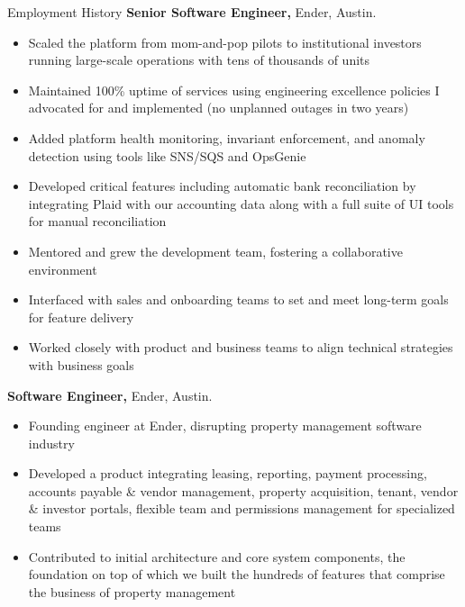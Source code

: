 \begin{rubric}{Employment History}
%
	\textbf{Senior Software Engineer,} Ender, Austin.
	\begin{itemize}
		\item Scaled the platform from mom-and-pop pilots to institutional investors running large-scale operations with tens of thousands of units
		\item Maintained 100\% uptime of services using engineering excellence policies I advocated for and implemented (no unplanned outages in two years)
		\item Added platform health monitoring, invariant enforcement, and anomaly detection using tools like SNS/SQS and OpsGenie
		\item Developed critical features including automatic bank reconciliation by integrating Plaid with our accounting data along with a full suite of UI tools for manual reconciliation
		\item Mentored and grew the development team, fostering a collaborative environment
		\item Interfaced with sales and onboarding teams to set and meet long-term goals for feature delivery
		\item Worked closely with product and business teams to align technical strategies with business goals
	\end{itemize}
%
%
	\textbf{Software Engineer,} Ender, Austin.
	\begin{itemize}
		\item Founding engineer at Ender, disrupting property management software industry
		\item Developed a product integrating leasing, reporting, payment processing, accounts payable \& vendor management, property acquisition, tenant, vendor \& investor portals, flexible team and permissions management for specialized teams
		\item Contributed to initial architecture and core system components, the foundation on top of which we built the hundreds of features that comprise the business of property management
	\end{itemize}
%
\end{rubric}
